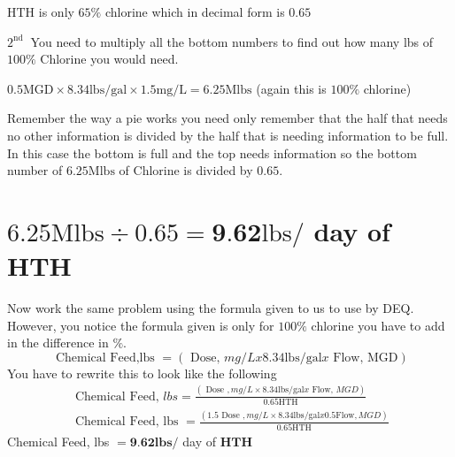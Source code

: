 \documentclass[10pt]{article}
\begin{document}
$\mathrm{HTH}$ is only $65 \%$ chlorine which in decimal form is $0.65$

$2^{\text {nd }}$ You need to multiply all the bottom numbers to find out how many lbs of $100 \%$ Chlorine you would need.

$0.5 \mathrm{MGD} \times 8.34 \mathrm{lbs} / \mathrm{gal} \times 1.5 \mathrm{mg} / \mathrm{L}=6.25 \mathrm{Mlbs}$ (again this is $100 \%$ chlorine)

Remember the way a pie works you need only remember that the half that needs no other information is divided by the half that is needing information to be full. In this case the bottom is full and the top needs information so the bottom number of $6.25 \mathrm{Mlbs}$ of Chlorine is divided by $0.65$.

\section{$6.25 \mathrm{Mlbs} \div 0.65=\mathbf{9 . 6 2} \mathrm{lbs} /$ day of $\mathbf{H T H}$}
Now work the same problem using the formula given to us to use by DEQ. However, you notice the formula given is only for $100 \%$ chlorine you have to add in the difference in $\%$.
$$
\text { Chemical Feed,lbs }=(\text { Dose, } m g / L x 8.34 \mathrm{lbs} / \mathrm{gal} x \text { Flow, } \mathrm{MGD})
$$
You have to rewrite this to look like the following
$$
\begin{gathered}
\text { Chemical Feed, } l b s=\frac{(\text { Dose }, m g / L \times 8.34 \mathrm{lbs} / \mathrm{gal} x \text { Flow, } M G D)}{0.65 \mathrm{HTH}} \\
\text { Chemical Feed, lbs }=\frac{(1.5 \text { Dose }, m g / L \times 8.34 \mathrm{lbs} / \mathrm{gal} x 0.5 \mathrm{Flow}, M G D)}{0.65 \mathrm{HTH}}
\end{gathered}
$$
Chemical Feed, lbs $=\mathbf{9 . 6 2} \mathbf{l b s} /$ day of $\mathbf{H T H}$
\end{document}
